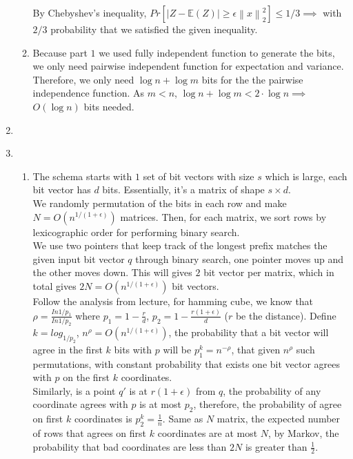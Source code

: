 \documentclass[11pt]{article}%
\newcommand{\norm}[1]{\left\lVert#1\right\rVert}
\begin{document}
\begin{questions}[1]
\begin{enumerate}
\begin{enumerate}
            By Chebyshev's inequality, $Pr[|Z - \mathbb{E}(Z)| \geq \epsilon \norm{x}_2^2] \leq 1/3 \implies$ with $2/3$ probability that we satisfied the given inequality.\\
            
            \item Because part $1$ we used fully independent function to generate the bits, we only need pairwise independent function for expectation and variance. Therefore, we only need $\log{n} + \log{m}$ bits for the the pairwise independence function. As $m < n$, $\log{n} + \log{m} < 2 \cdot \log{n} \implies$ $O(\log{n})$ bits needed.
        \end{enumerate}
    \item \\
    
    \item \begin{enumerate}
        \item The schema starts with $1$ set of bit vectors with size $s$ which is large, each bit vector has $d$ bits. Essentially, it's a matrix of shape $s \times d$.\\
        
        We randomly permutation of the bits in each row and make $N = O(n^{1/(1+\epsilon)})$ matrices. Then, for each matrix, we sort rows by lexicographic order for performing binary search.\\
        
        We use two pointers that keep track of the longest prefix matches the given input bit vector $q$ through binary search, one pointer moves up and the other moves down. This will gives $2$ bit vector per matrix, which in total gives $2N = O(n^{1/(1+\epsilon)})$ bit vectors.\\
        
        Follow the analysis from lecture, for hamming cube, we know that $\rho = \frac{In 1/p_1}{In 1/p_2}$ where $p_1 = 1 - \frac{r}{d}$, $p_2 = 1 - \frac{r(1+\epsilon)}{d}$ ($r$ be the distance). Define $k = log_{1/p_2}$,  $n^\rho = O(n^{1/(1+\epsilon)})$, the probability that a bit vector will agree in the first $k$ bits with $p$ will be $p_1^k = n^{-\rho}$, that given $n^\rho$ such permutations, with constant probability that exists one bit vector agrees with $p$ on the first $k$ coordinates. \\
        
        Similarly, is a point $q'$ is at $r(1+\epsilon)$ from $q$, the probability of any coordinate agrees with $p$ is at most $p_2$, therefore, the probability of agree on first $k$ coordinates is $p_2^k = \frac{1}{n}$. Same as $N$ matrix, the expected number of rows that agrees on first $k$ coordinates are at most $N$, by Markov, the probability that bad coordinates are less than $2N$ is greater than $\frac{1}{2}$.\\
        

\end{enumerate}
\end{enumerate}
\end{questions}
\end{document}
